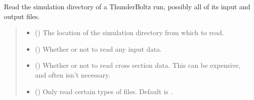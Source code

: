 \documentclass[letterpaper,10pt,english,openany,oneside]{sphinxmanual}
\begin{document}
\begin{fulllineitems}
\begin{fulllineitems}
\label{\detokenize{api/pytb.ThunderBoltz.read:pytb.ThunderBoltz.read}}
\pysigstartsignatures
{}
\pysigstopsignatures
\sphinxAtStartPar
Read the simulation directory of a ThunderBoltz run, possibly
all of its input and output files.
\begin{quote}\begin{description}
\begin{itemize}
\item {} 
\sphinxAtStartPar
{} () \textendash{} The location of the simulation directory
from which to read.

\item {} 
\sphinxAtStartPar
{} () \textendash{} Whether or not to read any input data.

\item {} 
\sphinxAtStartPar
{} () \textendash{} Whether or not to read cross section data.
This can be expensive, and often isn’t necessary.

\item {} 
\sphinxAtStartPar
{} () \textendash{} Only read certain types of files. Default is
.

\end{itemize}


\end{description}
\end{quote}
\end{fulllineitems}
\end{fulllineitems}
\end{document}

